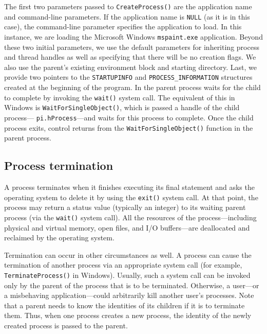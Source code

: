The first two parameters passed to \texttt{CreateProcess()} are the application name and command-line parameters. If the application name is \texttt{NULL} (as it is in this case), the command-line parameter specifies the application to load. In this instance, we are loading the Microsoft Windows \texttt{mspaint.exe} application. Beyond these two initial parameters, we use the default parameters for inheriting process and thread handles as well as specifying that there will be no creation flags. We also use the parent's existing environment block and starting directory. Last, we provide two pointers to the \texttt{STARTUPINFO} and \texttt{PROCESS\_INFORMATION} structures created at the beginning of the program. In the parent process waits for the child to complete by invoking the \texttt{wait()} system call. The equivalent of this in Windows is \texttt{WaitForSingleObject()}, which is passed a handle of the child process--- \texttt{pi.hProcess}---and waits for this process to complete. Once the child process exits, control returns from the \texttt{WaitForSingleObject()} function in the parent process.

\subsection*{Process termination}\label{sec:3.3:process_termination}
A process terminates when it finishes executing its final statement and asks the operating system to delete it by using the \texttt{exit()} system call. At that point, the process may return a status value (typically an integer) to its waiting parent process (via the \texttt{wait()} system call). All the resources of the process---including physical and virtual memory, open files, and I/O buffers---are deallocated and reclaimed by the operating system.

Termination can occur in other circumstances as well. A process can cause the termination of another process via an appropriate system call (for example, \texttt{TerminateProcess()} in Windows). Usually, such a system call can be invoked only by the parent of the process that is to be terminated. Otherwise, a user---or a misbehaving application---could arbitrarily kill another user's processes. Note that a parent needs to know the identities of its children if it is to terminate them. Thus, when one process creates a new process, the identity of the newly created process is passed to the parent.

